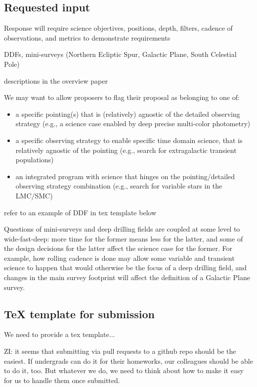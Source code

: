 \documentclass[DM,lsstdraft,toc,usenatbib]{lsstdoc}
\begin{document}
\subsection{Requested input}

Response will require science objectives, positions, depth, filters, cadence of observations, and metrics to demonstrate requirements
  

DDFs, mini-surveys (Northern Ecliptic Spur, Galactic Plane, South Celestial Pole) 

descriptions in the overview paper

We may want to allow proposers to flag their proposal as belonging to one of:
\begin{itemize} 
\item a specific pointing(s) that is (relatively) agnostic of the detailed observing strategy
          (e.g., a science case enabled by deep precise multi-color photometry) 
\item a specific observing strategy to enable specific time domain science, that is relatively 
          agnostic of the pointing (e.g., search for extragalactic transient populations) 
\item an integrated program with science that hinges on the pointing/detailed observing 
          strategy combination (e.g., search for variable stars in the LMC/SMC) 
\end{itemize}  

refer to an example of DDF in tex template below

Questions of
mini-surveys and deep drilling fields are coupled at some level to
wide-fast-deep: more time for the former means less for the latter,
and some of the design decisions for the latter affect the science
case for the former.  For example, how rolling cadence is done may
allow some variable and transient science to happen that would
otherwise be the focus of a deep drilling field, and changes in the
main survey footprint will affect the definition of a Galactic Plane
survey. 


\subsection{TeX template for submission} 

We need to provide a tex template... 

ZI: it seems that submitting via pull requests to a github repo should be the easiest. 
If undergrads can do it for their homeworks, our colleagues should be able to do it, too. 
But whatever we do, we need to think about how to make it easy for us to handle them
once submitted. 
\end{document}
